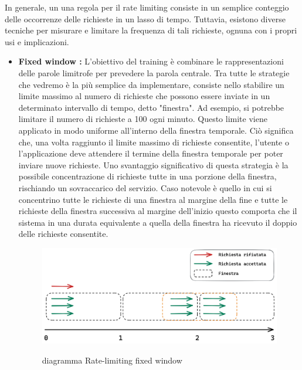 In generale, un una regola per il rate limiting consiste in un semplice conteggio delle occorrenze delle richieste in un
lasso di tempo. Tuttavia, esistono diverse tecniche per misurare e limitare la frequenza di tali richieste, ognuna con i
propri usi e implicazioni.
\begin{itemize}
    \item \textbf{Fixed window :} L'obiettivo del training è combinare le rappresentazioni delle parole limitrofe per
     prevedere la parola centrale. Tra tutte le strategie che vedremo è la più semplice da implementare, consiste nello
     stabilire un limite massimo al numero di richieste che possono essere inviate in un determinato intervallo di
     tempo, detto "finestra". Ad esempio, si potrebbe limitare il numero di richieste a 100 ogni minuto. Questo limite
     viene applicato in modo uniforme all'interno della finestra temporale. Ciò significa che, una volta raggiunto il
     limite massimo di richieste consentite, l'utente o l'applicazione deve attendere il termine della finestra
     temporale per poter inviare nuove richieste. Uno svantaggio significativo di questa strategia è la possibile
     concentrazione di richieste tutte in una porzione della finestra, rischiando un sovraccarico del servizio. Caso
     notevole è quello in cui si concentrino tutte le richieste di una finestra al margine della fine e tutte le
     richieste della finestra successiva al margine dell’inizio questo comporta che il sistema in una durata equivalente
     a quella della finestra ha ricevuto il doppio delle richieste consentite.\clearpage
        \begin{figure}[H]
        \centering
        \includegraphics[width=12cm]{./immagini/fixed_window.png}
        \label{fixed window diagram}
        \caption{diagramma Rate-limiting fixed window }
        \end{figure}
    

\end{itemize}
